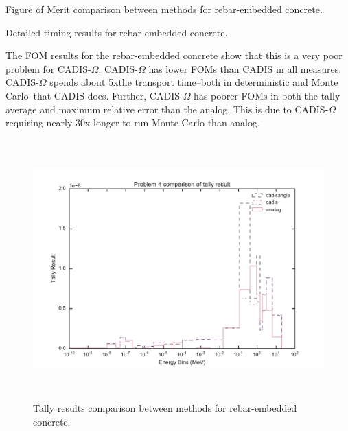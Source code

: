 \begin{table}[h!]
  \centering
  
  \caption[Figure of Merit comparison between methods for rebar-embedded
  concrete.]{Figure of Merit comparison between methods for rebar-embedded
  concrete.}
  \label{tab:rebarfoms}
\end{table}

\begin{table}[h!]
  \centering
  
  \caption[Detailed timing results for rebar-embedded concrete]
  {Detailed timing results for rebar-embedded concrete.}
  \label{tab:rebartimes}
\end{table}

The FOM results for the rebar-embedded concrete show that this is a very poor
problem for CADIS-$\Omega$. CADIS-$\Omega$ has lower FOMs than CADIS
in all measures. CADIS-$\Omega$ spends about 5xthe
transport time--both in
deterministic and Monte Carlo--that CADIS does. Further, CADIS-$\Omega$ has poorer FOMs in both
the tally average and maximum relative error than the analog. This is
due to CADIS-$\Omega$ requiring nearly 30x longer to run Monte Carlo than 
analog.

\begin{figure}[h!]
  \centering
  \includegraphics[height=10cm]{./chapters/characterization_probs/figures/char/prob_4/problem_4_tally_result_compare.pdf}
  \caption[Tally results comparison between methods for rebar-embedded concrete.]
  {Tally results comparison between methods for rebar-embedded concrete.}
  \label{fig:rebarresult}
\end{figure}

